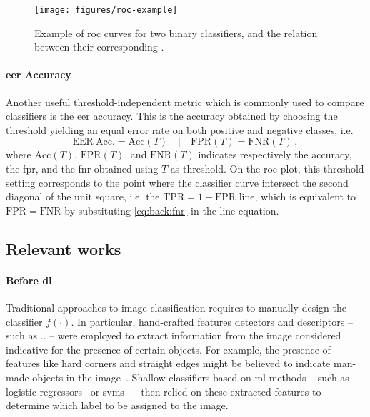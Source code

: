 \begin{figure}
    \centering
    \texttt{[image: figures/roc-example]}
    \caption{Example of \acrfull{roc} curves for two binary classifiers, and the relation between their corresponding . }
    \label{fig:back:roc}
\end{figure}

\paragraph{\acrshort{eer} Accuracy}
Another useful threshold-independent metric which is commonly used to compare classifiers is the \gls{eer} accuracy.
This is the accuracy obtained by choosing the threshold yielding an equal error rate on both positive and negative classes, i.e.
\begin{equation} \label{eq:back:eer-accuracy}
    \mathrm{EER\ Acc.} = \mathrm{Acc}(T) \quad | \quad \mathrm{FPR}(T) = \mathrm{FNR}(T) \,,
\end{equation}
where $\mathrm{Acc}(T)$, $\mathrm{FPR}(T)$, and $\mathrm{FNR}(T)$ indicates respectively the accuracy, the \gls{fpr}, and the \gls{fnr} obtained using $T$ as threshold.
On the \gls{roc} plot, this threshold setting corresponds to the point where the classifier curve intersect the second diagonal of the unit square, i.e. the $\mathrm{TPR} = 1 - \mathrm{FPR}$ line, which is equivalent to $\mathrm{FPR} = \mathrm{FNR}$ by substituting \ref{eq:back:fnr} in the line equation.

\subsection{Relevant works}
\label{subsec:back:classif-relwork}

\paragraph{Before \acrlong{dl}}
Traditional approaches to image classification requires to manually design the classifier $f(\cdot)$.
In particular, hand-crafted features detectors and descriptors -- such as .. -- were employed to extract information from the image considered indicative for the presence of certain objects.
For example, the presence of features like hard corners and straight edges might be believed to indicate man-made objects in the image~\cite{}.
Shallow classifiers based on \gls{ml} methods -- such as logistic regressors~\cite{} or \glspl{svm}~\cite{} -- then relied on these extracted features to determine which label to be assigned to the image.

